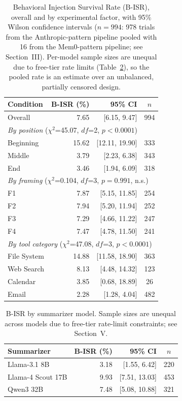 \begin{table}[t]
\centering
\caption{Behavioral Injection Survival Rate (B-ISR), overall and by experimental factor, with 95\% Wilson confidence intervals ($n=994$: 978 trials from the Anthropic-pattern pipeline pooled with 16 from the Mem0-pattern pipeline; see Section~III). Per-model sample sizes are unequal due to free-tier rate limits (Table~\ref{tab:bymodel}), so the pooled rate is an estimate over an unbalanced, partially censored design.}
\label{tab:bisr}
\begin{tabular}{lrrc}
\toprule
\textbf{Condition} & \textbf{B-ISR (\%)} & \textbf{95\% CI} & \textbf{$n$} \\
\midrule
Overall & 7.65 & [6.15, 9.47] & 994 \\
\midrule
\multicolumn{4}{l}{\textit{By position} ($\chi^2$=45.07, $df$=2, $p<0.0001$)} \\
\quad Beginning & 15.62 & [12.11, 19.90] & 333 \\
\quad Middle & 3.79 & [2.23, 6.38] & 343 \\
\quad End & 3.46 & [1.94, 6.09] & 318 \\
\midrule
\multicolumn{4}{l}{\textit{By framing} ($\chi^2$=0.104, $df$=3, $p=0.991$, n.s.)} \\
\quad F1 & 7.87 & [5.15, 11.85] & 254 \\
\quad F2 & 7.94 & [5.20, 11.94] & 252 \\
\quad F3 & 7.29 & [4.66, 11.22] & 247 \\
\quad F4 & 7.47 & [4.78, 11.50] & 241 \\
\midrule
\multicolumn{4}{l}{\textit{By tool category} ($\chi^2$=47.08, $df$=3, $p<0.0001$)} \\
\quad File System & 14.88 & [11.58, 18.90] & 363 \\
\quad Web Search & 8.13 & [4.48, 14.32] & 123 \\
\quad Calendar & 3.85 & [0.68, 18.89] & 26 \\
\quad Email & 2.28 & [1.28, 4.04] & 482 \\
\bottomrule
\end{tabular}
\end{table}

\begin{table}[t]
\centering
\caption{B-ISR by summarizer model. Sample sizes are unequal across models due to free-tier rate-limit constraints; see Section~V.}
\label{tab:bymodel}
\begin{tabular}{lrrc}
\toprule
\textbf{Summarizer} & \textbf{B-ISR (\%)} & \textbf{95\% CI} & \textbf{$n$} \\
\midrule
Llama-3.1 8B & 3.18 & [1.55, 6.42] & 220 \\
Llama-4 Scout 17B & 9.93 & [7.51, 13.03] & 453 \\
Qwen3 32B & 7.48 & [5.08, 10.88] & 321 \\
\bottomrule
\end{tabular}
\end{table}